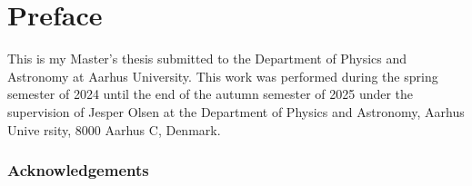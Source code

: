 \chapter*{Preface}
This is my Master's thesis submitted to the Department of Physics and Astronomy at Aarhus University. This work was performed during the spring semester of 2024 until the end of the autumn semester of 2025 under the supervision of Jesper Olsen at the Department of Physics and Astronomy, Aarhus Unive
rsity, 8000 Aarhus C, Denmark.




\subsection*{Acknowledgements}

